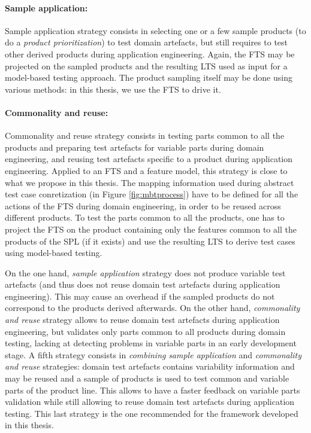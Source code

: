 \paragraph{Sample application:} 

Sample application strategy consists in selecting one or a few sample products (\ie to do a \emph{product prioritization}) to test domain artefacts, but still requires to test other derived products during application engineering. Again, the \gls{FTS} may be projected on the sampled products and the resulting \gls{LTS} used as input for a model-based testing approach. The product sampling itself may be done using various methods: in this thesis, we use the \gls{FTS} to drive it.


\paragraph{Commonality and reuse:} 

Commonality and reuse strategy consists in testing parts common to all the products and preparing test artefacts for variable parts during domain engineering, and reusing test artefacts specific to a product during application engineering. Applied to an \gls{FTS} and a \gls{feature model}, this strategy is close to what we propose in this thesis. The mapping information used during abstract test case conretization (in Figure \ref{fig:mbtprocess}) have to be defined for all the actions of the FTS during domain engineering, in order to be reused across different products. To test the parts common to all the products, one has to project the FTS on the product containing only the features common to all the products of the SPL (if it exists) and use the resulting LTS to derive test cases using model-based testing.

On the one hand, \textit{sample application} strategy does not produce variable test artefacts (and thus does not reuse domain test artefacts during application engineering). This may cause an overhead if the sampled products do not correspond to the products derived afterwards. On the other hand, \textit{commonality and reuse} strategy allows to reuse domain test artefacts during application engineering, but validates only parts common to all products during domain testing, lacking at detecting problems in variable parts in an early development stage.
A fifth strategy consists in \emph{combining} \textit{sample application} and \textit{commonality and reuse} strategies: domain test artefacts contains variability information and may be reused and a sample of products is used to test common and variable parts of the product line. This allows to have a faster feedback on variable parts validation while still allowing to reuse domain test artefacts during application testing. This last strategy is the one recommended for the framework developed in this thesis. 

